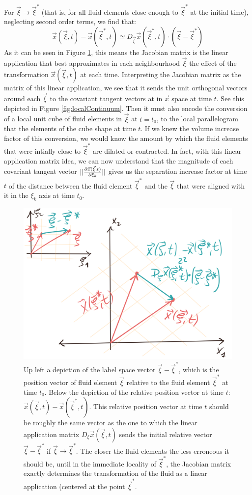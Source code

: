 \documentclass[11pt, a4paper]{article} %
\begin{document}
For $\vec{\xi}\rightarrow \vec{\xi}^*$ (that is, for all fluid elements close enough to $\vec{\xi}^*$ at the initial time), neglecting second order terms, we find that:
\begin{equation}
\vec{x}(\vec{\xi},t)-\vec{x}(\vec{\xi}^*,t)\simeq D_{\vec{\xi}}\vec{x}(\vec{\xi}^*,t)\cdot (\vec{\xi}-\vec{\xi}^*)
\end{equation}
As it can be seen in Figure \ref{fig:JacobMatrix}, this means the Jacobian matrix is the linear application that best approximates in each neighbourhood $\vec{\xi}$ the effect of the transformation $\vec{x}(\vec{\xi},t)$ at each time. Interpreting the Jacobian matrix as the matrix of this linear application, we see that it sends the unit orthogonal vectors around each $\vec{\xi}$ to the covariant tangent vectors at in $\vec{x}$ space at time $t$. See this depicted in Figure \ref{fig:localContinuum}. Then it must also encode the conversion of a local unit cube of fluid elements in $\vec{\xi}$ at $t=t_0$, to the local parallelogram that the elements of the cube shape at time $t$. If we knew the volume increase factor of this conversion, we would know the amount by which the fluid elements that were intially close to $\vec{\xi}^*$ are dilated or contracted. In fact, with this linear application matrix idea, we can now understand that the magnitude of each covariant tangent vector $||\pdv{\vec{x}(\vec{\xi},t)}{\xi_k}||$ gives us the separation increase factor at time $t$ of the distance between the fluid element $\vec{\xi}^*$ and the $\vec{\xi}$ that were aligned with it in the $\xi_k$ axis at time $t_0$.

\begin{figure}[h!]
  \centering
    \includegraphics[width=0.65\linewidth]{2Jacob_as_lin_app.png}
  \caption{Up left a depiction of the label space vector $\vec{\xi}-\vec{\xi}^*$, which is the position vector of fluid element $\vec{\xi}$ relative to the fluid element $\vec{\xi}^*$ at time $t_0$. Below the depiction of the relative position vector at time $t$: $\vec{x}(\vec{\xi},t)-\vec{x}(\vec{\xi}^*,t)$. This relative position vector at time $t$ should be roughly the same vector as the one to which the linear application matrix $D_\xi \vec{x}(\vec{\xi},t)$ sends the initial relative vector $\vec{\xi}-\vec{\xi}^*$ if $\vec{\xi}\rightarrow \vec{\xi}^*$. The closer the fluid elements the less erroneous it should be, until in the immediate locality of $\vec{\xi}^*$, the Jacobian matrix exactly determines the transformation of the fluid as a linear application (centered at the point $\vec{\xi}^*$.  }
  \label{fig:JacobMatrix}
\end{figure}
\end{document}
